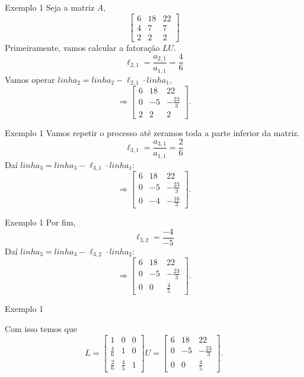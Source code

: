 \documentclass[]{beamer}
\begin{document}
\begin{frame}{Exemplo 1}
Seja a matriz $A,$
$$\begin{bmatrix}6&18&22\\ 4&7&7\\ 2&2&2\end{bmatrix}$$
Primeiramente, vamos calcular a fatoração $LU.$
$$\ell_{2,1} = \dfrac{a_{2,1}}{a_{1,1}}= \dfrac{4}{6}$$
Vamos operar $linha_2 = linha_2 - \ell_{2,1} \cdot linha_1,$
$$\Rightarrow \begin{bmatrix}6&18&22\\ 0&-5&-\frac{23}{3}\\ 2&2&2\end{bmatrix}.$$
\end{frame}

\begin{frame}{Exemplo 1}
Vamos repetir o processo até zeramos toda a parte inferior da matriz.
$$\ell_{3,1} = \dfrac{a_{3,1}}{a_{1,1}} = \dfrac{2}{6}$$
Daí $linha_3 = linha_3 - \ell_{3,1} \cdot linha_1: $
$$\Rightarrow \begin{bmatrix}6&18&22\\ 0&-5&-\frac{23}{3}\\ 0&-4&-\frac{16}{3}\end{bmatrix}.$$
\end{frame}

\begin{frame}{Exemplo 1}
Por fim, $$\ell_{3,2}  = \dfrac{-4}{-5}$$
Daí $linha_3 = linha_3 - \ell_{3,2} \cdot linha_2: $
$$\Rightarrow \begin{bmatrix}6&18&22\\ 0&-5&-\frac{23}{3}\\ 0&0&\frac{4}{5}\end{bmatrix}.$$
\end{frame}

\begin{frame}{Exemplo 1}

Com isso temos que $$L=\begin{bmatrix}1&0&0\\ \frac{4}{6}&1&0\\ \frac{2}{6}&\frac{4}{5}&1\end{bmatrix} U = \begin{bmatrix}6&18&22\\ 0&-5&-\frac{23}{3}\\ 0&0&\frac{4}{5}\end{bmatrix}.$$ 
\end{frame}
\end{document}
